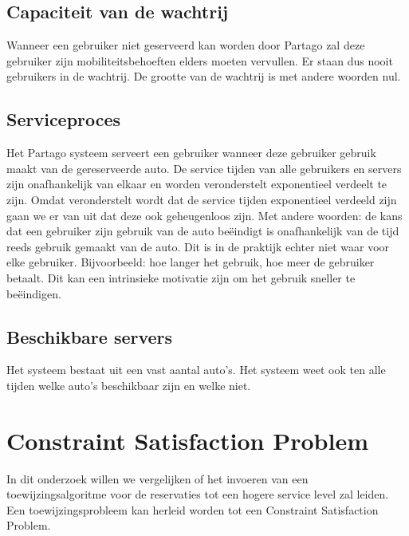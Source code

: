 \subsection{Capaciteit van de wachtrij}
Wanneer een gebruiker niet geserveerd kan worden door Partago zal deze gebruiker zijn mobiliteitsbehoeften elders moeten vervullen. Er staan dus nooit gebruikers in de wachtrij. De grootte van de wachtrij is met andere woorden nul.

\subsection{Serviceproces}
Het Partago systeem serveert een gebruiker wanneer deze gebruiker gebruik maakt van de gereserveerde auto. De service tijden van alle gebruikers en servers zijn onafhankelijk van elkaar en worden veronderstelt exponentieel verdeelt te zijn. Omdat veronderstelt wordt dat de service tijden exponentieel verdeeld zijn gaan we er van uit dat deze ook geheugenloos zijn. Met andere woorden: de kans dat een gebruiker zijn gebruik van de auto beëindigt is onafhankelijk van de tijd reeds gebruik gemaakt van de auto. Dit is in de praktijk echter niet waar voor elke gebruiker. Bijvoorbeeld: hoe langer het gebruik, hoe meer de gebruiker betaalt. Dit kan een intrinsieke motivatie zijn om het gebruik sneller te beëindigen.

\subsection{Beschikbare servers}
Het systeem bestaat uit een vast aantal auto's. Het systeem weet ook ten alle tijden welke auto's beschikbaar zijn en welke niet.

\section{Constraint Satisfaction Problem}

In dit onderzoek willen we vergelijken of het invoeren van een toewijzingsalgoritme voor de reservaties tot een hogere service level zal leiden. Een toewijzingsprobleem kan herleid worden tot een Constraint Satisfaction Problem.

